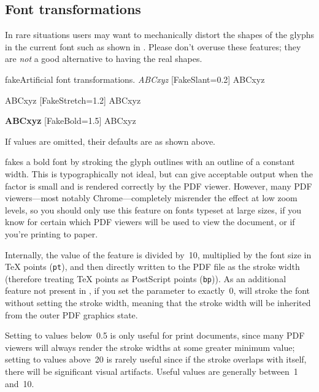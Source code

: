 \documentclass[a4paper]{l3doc}
\begin{document}
\subsection{Font transformations}

In rare situations users may want to mechanically distort the shapes of the glyphs in the current font such as shown in . Please don't overuse these features; they are \emph{not} a good alternative to having the real shapes.

\begin{Xexample}{fake}{Artificial font transformations.}
   \emph{ABCxyz} \quad
  [FakeSlant=0.2] ABCxyz

    ABCxyz \quad
  [FakeStretch=1.2] ABCxyz

   \textbf{ABCxyz} \quad
  [FakeBold=1.5] ABCxyz
\end{Xexample}

If values are omitted, their defaults are as shown above.

 fakes a bold font by stroking the glyph outlines with an outline
of a constant width. This is typographically not ideal, but can give acceptable
output when the factor is small and is rendered correctly by the PDF viewer. However,
many PDF viewers---most notably Chrome---completely misrender the effect at low
zoom levels, so you should only use this feature on fonts typeset at large
sizes, if you know for certain which PDF viewers will be used to view the
document, or if you're printing to paper.

Internally, the value of the  feature is divided by~10,
multiplied by the font size in \TeX{} points (\verb|pt|), and then directly
written to the PDF file as the stroke width (therefore treating \TeX{} points as
PostScript points (\verb|bp|)). As an additional feature not present in \XeTeX,
if you set the  parameter to exactly~0, \LuaTeX{} will stroke the
font without setting the stroke width, meaning that the stroke width will be
inherited from the outer PDF graphics state.

Setting  to values below~0.5 is only useful for print documents,
since many PDF viewers will always render the stroke widths at some greater
minimum value; setting  to values above~20 is rarely useful since
if the stroke overlaps with itself, there will be significant visual artifacts.
Useful values are generally between~1 and~10.
\end{document}
